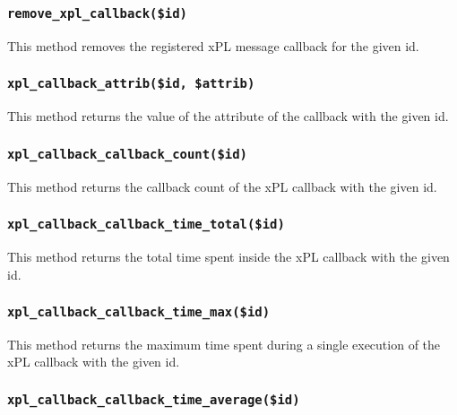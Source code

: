 \documentclass[12pt,a4paper]{article}
\begin{document}
\subsubsection*{\texttt{remove\_xpl\_callback(\$id)}\label{xPL::Listener_remove_xpl_callback_id_}}


This method removes the registered xPL message callback for the given
id.

\subsubsection*{\texttt{xpl\_callback\_attrib(\$id, \$attrib)}\label{xPL::Listener_xpl_callback_attrib_id_attrib_}}


This method returns the value of the attribute of the callback with
the given id.

\subsubsection*{\texttt{xpl\_callback\_callback\_count(\$id)}\label{xPL::Listener_xpl_callback_callback_count_id_}}


This method returns the callback count of the xPL callback with
the given id.

\subsubsection*{\texttt{xpl\_callback\_callback\_time\_total(\$id)}\label{xPL::Listener_xpl_callback_callback_time_total_id_}}


This method returns the total time spent inside the xPL callback with
the given id.

\subsubsection*{\texttt{xpl\_callback\_callback\_time\_max(\$id)}\label{xPL::Listener_xpl_callback_callback_time_max_id_}}


This method returns the maximum time spent during a single execution
of the xPL callback with the given id.

\subsubsection*{\texttt{xpl\_callback\_callback\_time\_average(\$id)}\label{xPL::Listener_xpl_callback_callback_time_average_id_}}
\end{document}
